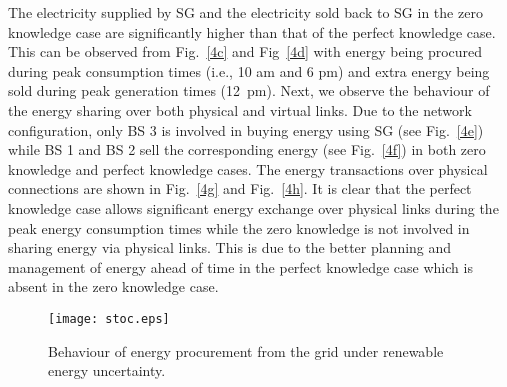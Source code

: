 \documentclass[10pt, letter,twocolumn]{IEEEtran}
\begin{document}
The electricity supplied by SG and the electricity sold back to SG in the zero knowledge case are significantly higher than that of the perfect knowledge case. This can be observed from Fig.~\ref{4c} and Fig~\ref{4d} with energy being procured during peak consumption times (i.e., 10 am and 6 pm) and extra energy being sold during peak generation times (12~pm). Next, we observe the behaviour of the energy sharing over both physical and virtual links. Due to the network configuration, only BS 3 is involved in buying energy using SG (see Fig.~\ref{4e}) while BS 1 and BS 2 sell the corresponding energy (see Fig.~\ref{4f}) in both zero knowledge and perfect knowledge cases. The energy transactions over physical connections are shown in Fig.~\ref{4g} and Fig.~\ref{4h}. It is clear that the perfect knowledge case allows significant energy exchange over physical links during the peak energy consumption times while the zero knowledge is not involved in sharing energy via physical links. This is due to the better planning and management of energy ahead of time in the perfect knowledge case which is absent in the zero knowledge case.
\begin{figure}[t]
  \centering
  \texttt{[image: stoc.eps]}\vspace{-0.0in}
  \caption{Behaviour of energy procurement from the grid under renewable energy uncertainty.}\label{stochastic_fig}\vspace{-0.0in}
\end{figure}
\end{document}
